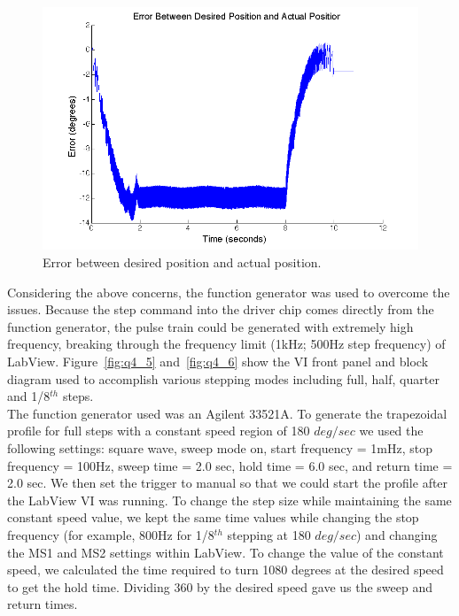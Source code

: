 \documentclass{article}
\theoremstyle{plain}
\theoremstyle{definition}
\theoremstyle{remark}
\begin{document}
\begin{figure}
\begin{center}
\includegraphics[width = 12cm]{labViewProfileError.png}
\caption{Error between desired position and actual position.}
\label{Q4a_Alt7}
\end{center}
\end{figure}

\clearpage


Considering the above concerns, the function generator was used to overcome the issues. Because the step command into the driver chip comes directly from the function generator, the pulse train could be generated with extremely high frequency, breaking through the frequency limit (1kHz; 500Hz step frequency) of LabView. Figure~\ref{fig:q4_5} and~\ref{fig:q4_6} show the VI front panel and block diagram used to accomplish various stepping modes including full, half, quarter and 1/8$^{th}$ steps.\\

The function generator used was an Agilent 33521A. To generate the trapezoidal profile for full steps with a constant speed region of 180 $deg/sec$ we used the following settings: square wave, sweep mode on, start frequency = 1mHz, stop frequency = 100Hz, sweep time = 2.0 sec, hold time = 6.0 sec, and return time = 2.0 sec. We then set the trigger to manual so that we could start the profile after the LabView VI was running. To change the step size while maintaining the same constant speed value, we kept the same time values while changing the stop frequency (for example, 800Hz for 1/8$^{th}$ stepping at 180 $deg/sec$) and changing the MS1 and MS2 settings within LabView. To change the value of the constant speed, we calculated the time required to turn 1080 degrees at the desired speed to get the hold time. Dividing 360 by the desired speed gave us the sweep and return times.\\
\end{document}
